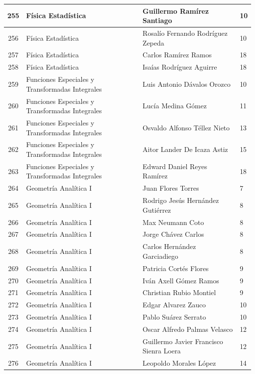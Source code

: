 {\begin{longtable}{|c|p{6.5cm}|p{5cm}|p{1.5cm}|}
  255 & Física Estadística & Guillermo Ramírez Santiago & 10 \\ \hline 
  256 & Física Estadística & Rosalío Fernando Rodríguez Zepeda & 10 \\ \hline 
  257 & Física Estadística & Carlos Ramírez Ramos & 18 \\ \hline 
  258 & Física Estadística & Isaías Rodríguez Aguirre & 18 \\ \hline 
  259 & Funciones Especiales y Transformadas Integrales & Luis Antonio Dávalos Orozco & 10 \\ \hline 
  260 & Funciones Especiales y Transformadas Integrales & Lucía Medina Gómez & 11 \\ \hline 
  261 & Funciones Especiales y Transformadas Integrales & Osvaldo Alfonso Téllez Nieto & 13 \\ \hline 
  262 & Funciones Especiales y Transformadas Integrales & Aitor Lander De Icaza Astiz & 15 \\ \hline 
  263 & Funciones Especiales y Transformadas Integrales & Edward Daniel Reyes Ramírez & 18 \\ \hline 
  264 & Geometría Analítica I & Juan Flores Torres & 7 \\ \hline 
  265 & Geometría Analítica I & Rodrigo Jesús Hernández Gutiérrez & 8 \\ \hline 
  266 & Geometría Analítica I & Max Neumann Coto & 8 \\ \hline 
  267 & Geometría Analítica I & Jorge Chávez Carlos & 8 \\ \hline 
  268 & Geometría Analítica I & Carlos Hernández Garciadiego & 8 \\ \hline 
  269 & Geometría Analítica I & Patricia Cortés Flores & 9 \\ \hline 
  270 & Geometría Analítica I & Iván Axell Gómez Ramos & 9 \\ \hline 
  271 & Geometría Analítica I & Christian Rubio Montiel & 9 \\ \hline 
  272 & Geometría Analítica I & Edgar Alvarez Zauco & 10 \\ \hline 
  273 & Geometría Analítica I & Pablo Suárez Serrato & 10 \\ \hline 
  274 & Geometría Analítica I & Oscar Alfredo Palmas Velasco & 12 \\ \hline 
  275 & Geometría Analítica I & Guillermo Javier Francisco Sienra Loera & 12 \\ \hline 
  276 & Geometría Analítica I & Leopoldo Morales López & 14 \\ \hline 

\end{longtable}}
